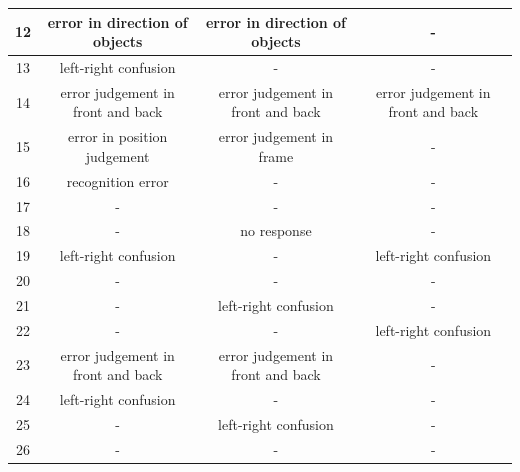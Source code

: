 \documentclass[journal,10pt]{IEEEtran}
\begin{document}
\begin{table}[]
{\begin{tabular}{|c|c|c|c|}
    12              & error in direction of objects     & error in direction of objects     & -                                 \\ \hline
    13              & left-right confusion              & -                                 & -                                 \\ \hline
    14              & error judgement in front and back & error judgement in front and back & error judgement in front and back \\ \hline
    15              & error in position judgement       & error judgement in frame          & -                                 \\ \hline
    16              & recognition error                 & -                                 & -                                 \\ \hline
    17              & -                                 & -                                 & -                                 \\ \hline
    18              & -                                 & no response                       & -                                 \\ \hline
    19              & left-right confusion              & -                                 & left-right confusion              \\ \hline
    20              & -                                 & -                                 & -                                 \\ \hline
    21              & -                                 & left-right confusion              & -                                 \\ \hline
    22              & -                                 & -                                 & left-right confusion              \\ \hline
    23              & error judgement in front and back & error judgement in front and back & -                                 \\ \hline
    24              & left-right confusion              & -                                 & -                                 \\ \hline
    25              & -                                 & left-right confusion              & -                                 \\ \hline
    26              & -                                 & -                                 & -                                 \\ \hline

\end{tabular}}
\end{table}
\end{document}
